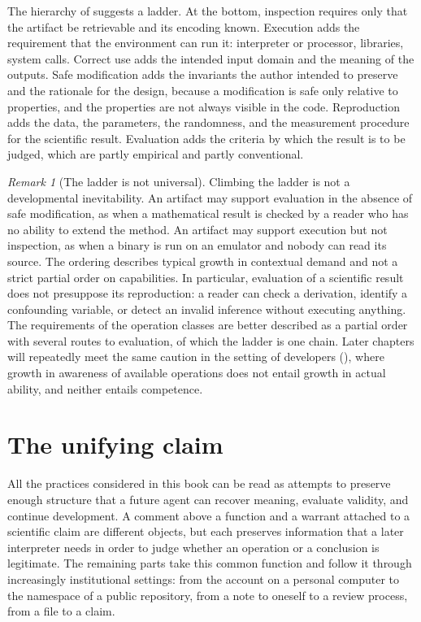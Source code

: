 \documentclass[11pt,twoside,openright]{book}
\theoremstyle{plain}
\theoremstyle{definition}
\theoremstyle{remark}
\newtheorem{remark}[theorem]{Remark}
\begin{document}
The hierarchy of  suggests a ladder. At the bottom, inspection requires only that the artifact be retrievable and its encoding known. Execution adds the requirement that the environment can run it: interpreter or processor, libraries, system calls. Correct use adds the intended input domain and the meaning of the outputs. Safe modification adds the invariants the author intended to preserve and the rationale for the design, because a modification is safe only relative to properties, and the properties are not always visible in the code. Reproduction adds the data, the parameters, the randomness, and the measurement procedure for the scientific result. Evaluation adds the criteria by which the result is to be judged, which are partly empirical and partly conventional.

\begin{remark}[The ladder is not universal]
Climbing the ladder is not a developmental inevitability. An artifact may support evaluation in the absence of safe modification, as when a mathematical result is checked by a reader who has no ability to extend the method. An artifact may support execution but not inspection, as when a binary is run on an emulator and nobody can read its source. The ordering describes typical growth in contextual demand and not a strict partial order on capabilities. In particular, evaluation of a scientific result does not presuppose its reproduction: a reader can check a derivation, identify a confounding variable, or detect an invalid inference without executing anything. The requirements of the operation classes are better described as a partial order with several routes to evaluation, of which the ladder is one chain. Later chapters will repeatedly meet the same caution in the setting of developers (), where growth in awareness of available operations does not entail growth in actual ability, and neither entails competence.
\end{remark}

\section{The unifying claim}

All the practices considered in this book can be read as attempts to preserve enough structure that a future agent can recover meaning, evaluate validity, and continue development. A comment above a function and a warrant attached to a scientific claim are different objects, but each preserves information that a later interpreter needs in order to judge whether an operation or a conclusion is legitimate. The remaining parts take this common function and follow it through increasingly institutional settings: from the account on a personal computer to the namespace of a public repository, from a note to oneself to a review process, from a file to a claim.
\end{document}
